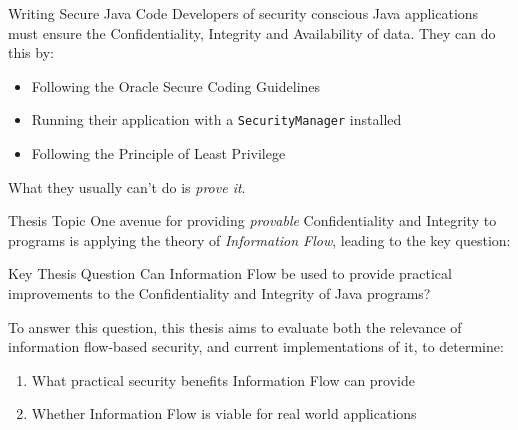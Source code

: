 \begin{frame}{Writing Secure Java Code}
	Developers of security conscious Java applications must ensure the Confidentiality, Integrity and Availability of data. They can do this by:
	
	\begin{itemize}
		\item Following the Oracle Secure Coding Guidelines
		\item Running their application with a \texttt{SecurityManager} installed
		\item Following the Principle of Least Privilege
	\end{itemize}
	
	What they usually can't do is \textit{prove it}.
\end{frame}

\begin{frame}{Thesis Topic}
	One avenue for providing \textit{provable} Confidentiality and Integrity to programs is applying the theory of \textit{Information Flow}, leading to the key question:
	
	\begin{block}{Key Thesis Question}
		Can Information Flow be used to provide practical improvements to the Confidentiality and Integrity of Java programs?
	\end{block}
	
	To answer this question, this thesis aims to evaluate both the relevance of information flow-based security, and current implementations of it, to determine:
	
	\begin{enumerate}
		\item What practical security benefits Information Flow can provide
		\item Whether Information Flow is viable for real world applications
	\end{enumerate}
\end{frame}